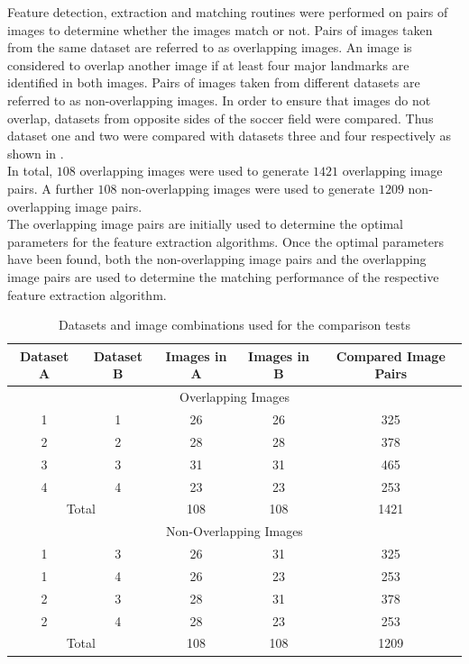 \documentclass{article}
\begin{document}
Feature detection, extraction and matching routines were performed on pairs of images to determine whether the images match or not. Pairs of images taken from the same dataset are referred to as overlapping images. An image is considered to overlap another image if at least four major landmarks are identified in both images. Pairs of images taken from different datasets are referred to as non-overlapping images. In order to ensure that images do not overlap, datasets from opposite sides of the soccer field were compared. Thus dataset one and two were compared with datasets three and four respectively as shown in . \\

In total, $108$ overlapping images were used to generate $1421$ overlapping image pairs. A further $108$ non-overlapping images were used to generate $1209$ non-overlapping image pairs.\\ 

The overlapping image pairs are initially used to determine the optimal parameters for the feature extraction algorithms. Once the optimal parameters have been found, both the non-overlapping image pairs and the overlapping image pairs are used to determine the matching performance of the respective feature extraction algorithm.\\

\begin{table}
\caption{Datasets and image combinations used for the comparison tests}
\begin{tabular}{|c|c|c|c|c|}
\hline 
Dataset A & Dataset B & Images in A & Images in B & Compared Image Pairs\tabularnewline
\hline 
\hline 
\multicolumn{5}{|c}{Overlapping Images}\tabularnewline
\hline 
1 & 1 & 26 & 26 & 325\tabularnewline
\hline 
2 & 2 & 28 & 28 & 378\tabularnewline
\hline 
3 & 3 & 31 & 31 & 465\tabularnewline
\hline 
4 & 4 & 23 & 23 & 253\tabularnewline
\hline 
\multicolumn{2}{|c|}{Total} & 108 & 108 & 1421\tabularnewline
\hline 
\multicolumn{5}{|c}{Non-Overlapping Images}\tabularnewline
\hline 
1 & 3 & 26 & 31 & 325\tabularnewline
\hline 
1 & 4 & 26 & 23 & 253\tabularnewline
\hline 
2 & 3 & 28 & 31 & 378\tabularnewline
\hline 
2 & 4 & 28 & 23 & 253\tabularnewline
\hline 
\multicolumn{2}{|c|}{Total} & 108 & 108 & 1209\tabularnewline
\hline 
\end{tabular}
\label{table:overlap}
\end{table}
\end{document}
